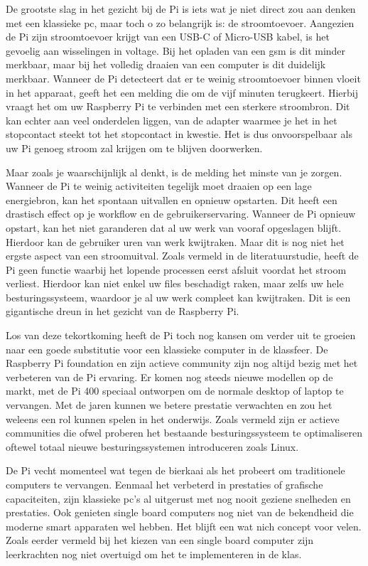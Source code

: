 De grootste slag in het gezicht bij de Pi is iets wat je niet direct zou aan denken met een klassieke pc, maar toch o zo belangrijk is: de stroomtoevoer. Aangezien de Pi zijn stroomtoevoer krijgt van een USB-C of Micro-USB kabel, is het gevoelig aan wisselingen in voltage. Bij het opladen van een gsm is dit minder merkbaar, maar bij het volledig draaien van een computer is dit duidelijk merkbaar. Wanneer de Pi detecteert dat er te weinig stroomtoevoer binnen vloeit in het apparaat, geeft het een melding die om de vijf minuten terugkeert. Hierbij vraagt het om uw Raspberry Pi te verbinden met een sterkere stroombron. Dit kan echter aan veel onderdelen liggen, van de adapter waarmee je het in het stopcontact steekt tot het stopcontact in kwestie. Het is dus onvoorspelbaar als uw Pi genoeg stroom zal krijgen om te blijven doorwerken.

Maar zoals je waarschijnlijk al denkt, is de melding het minste van je zorgen. Wanneer de Pi te weinig activiteiten tegelijk moet draaien op een lage energiebron, kan het spontaan uitvallen en opnieuw opstarten. Dit heeft een drastisch effect op je workflow en de gebruikerservaring. Wanneer de Pi opnieuw opstart, kan het niet garanderen dat al uw werk van vooraf opgeslagen blijft. Hierdoor kan de gebruiker uren van werk kwijtraken. 
Maar dit is nog niet het ergste aspect van een stroomuitval. Zoals vermeld in de literatuurstudie, heeft de Pi geen functie waarbij het lopende processen eerst afsluit voordat het stroom verliest. Hierdoor kan niet enkel uw files beschadigt raken, maar zelfs uw hele besturingssysteem, waardoor je al uw werk compleet kan kwijtraken. Dit is een gigantische dreun in het gezicht van de Raspberry Pi.  

Los van deze tekortkoming heeft de Pi toch nog kansen om verder uit te groeien naar een goede substitutie voor een klassieke computer in de klassfeer. De Raspberry Pi foundation en zijn actieve community zijn nog altijd bezig met het verbeteren van de Pi ervaring. Er komen nog steeds nieuwe modellen op de markt, met de Pi 400 speciaal ontworpen om de normale desktop of laptop te vervangen. Met de jaren kunnen we betere prestatie verwachten en zou het weleens een rol kunnen spelen in het onderwijs.
Zoals vermeld zijn er actieve communities die ofwel proberen het bestaande besturingssysteem te optimaliseren oftewel totaal nieuwe besturingssystemen introduceren zoals Linux. 

De Pi vecht momenteel wat tegen de bierkaai als het probeert om traditionele computers te vervangen. Eenmaal het verbeterd in prestaties of grafische capaciteiten, zijn klassieke pc’s al uitgerust met nog nooit geziene snelheden en prestaties. Ook genieten single board computers nog niet van de bekendheid die moderne smart apparaten wel hebben. Het blijft een wat nich concept voor velen. Zoals eerder vermeld bij het kiezen van een single board computer zijn leerkrachten nog niet overtuigd om het te implementeren in de klas.




